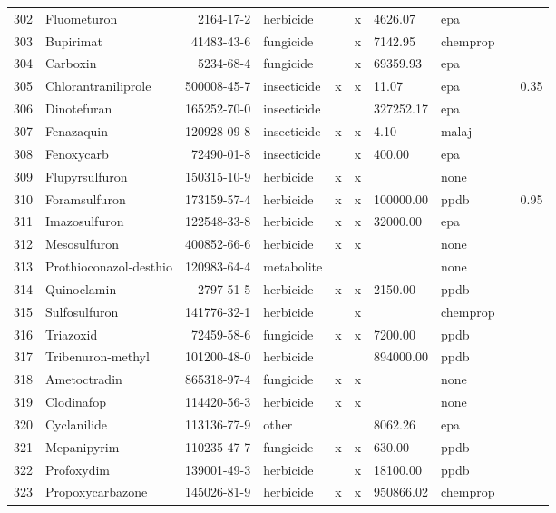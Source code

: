 \begin{longtable}{lp{3cm}rlp{0.5cm}p{0.5cm}p{1cm}p{1cm}p{1cm}p{1cm}}
  302 & Fluometuron & 2164-17-2 & herbicide &  & x & 4626.07 & epa &  &  \\ 
  303 & Bupirimat & 41483-43-6 & fungicide &  & x & 7142.95 & chemprop &  &  \\ 
  304 & Carboxin & 5234-68-4 & fungicide &  & x & 69359.93 & epa &  &  \\ 
  305 & Chlorantraniliprole & 500008-45-7 & insecticide & x & x & 11.07 & epa &  & 0.35 \\ 
  306 & Dinotefuran & 165252-70-0 & insecticide &  &  & 327252.17 & epa &  &  \\ 
  307 & Fenazaquin & 120928-09-8 & insecticide & x & x & 4.10 & malaj &  &  \\ 
  308 & Fenoxycarb & 72490-01-8 & insecticide &  & x & 400.00 & epa &  &  \\ 
  309 & Flupyrsulfuron & 150315-10-9 & herbicide & x & x &  & none &  &  \\ 
  310 & Foramsulfuron & 173159-57-4 & herbicide & x & x & 100000.00 & ppdb &  & 0.95 \\ 
  311 & Imazosulfuron & 122548-33-8 & herbicide & x & x & 32000.00 & epa &  &  \\ 
  312 & Mesosulfuron & 400852-66-6 & herbicide & x & x &  & none &  &  \\ 
  313 & Prothioconazol-desthio & 120983-64-4 & metabolite &  &  &  & none &  &  \\ 
  314 & Quinoclamin & 2797-51-5 & herbicide & x & x & 2150.00 & ppdb &  &  \\ 
  315 & Sulfosulfuron & 141776-32-1 & herbicide &  & x &  & chemprop &  &  \\ 
  316 & Triazoxid & 72459-58-6 & fungicide & x & x & 7200.00 & ppdb &  &  \\ 
  317 & Tribenuron-methyl & 101200-48-0 & herbicide &  &  & 894000.00 & ppdb &  &  \\ 
  318 & Ametoctradin & 865318-97-4 & fungicide & x & x &  & none &  &  \\ 
  319 & Clodinafop & 114420-56-3 & herbicide & x & x &  & none &  &  \\ 
  320 & Cyclanilide & 113136-77-9 & other &  &  & 8062.26 & epa &  &  \\ 
  321 & Mepanipyrim & 110235-47-7 & fungicide & x & x & 630.00 & ppdb &  &  \\ 
  322 & Profoxydim & 139001-49-3 & herbicide &  & x & 18100.00 & ppdb &  &  \\ 
  323 & Propoxycarbazone & 145026-81-9 & herbicide & x & x & 950866.02 & chemprop &  &  \\ 

\end{longtable}
